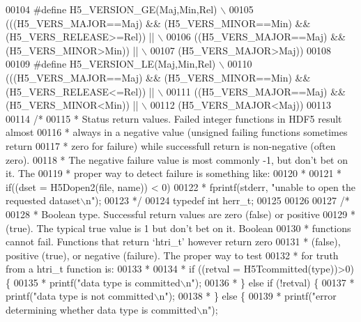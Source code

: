\begin{DoxyCode}
00104 \textcolor{preprocessor}{#define H5\_VERSION\_GE(Maj,Min,Rel) \(\backslash\)}
00105 \textcolor{preprocessor}{       (((H5\_VERS\_MAJOR==Maj) && (H5\_VERS\_MINOR==Min) && (H5\_VERS\_RELEASE>=Rel)) || \(\backslash\)}
00106 \textcolor{preprocessor}{        ((H5\_VERS\_MAJOR==Maj) && (H5\_VERS\_MINOR>Min)) || \(\backslash\)}
00107 \textcolor{preprocessor}{        (H5\_VERS\_MAJOR>Maj))}
00108 
00109 \textcolor{preprocessor}{#define H5\_VERSION\_LE(Maj,Min,Rel) \(\backslash\)}
00110 \textcolor{preprocessor}{       (((H5\_VERS\_MAJOR==Maj) && (H5\_VERS\_MINOR==Min) && (H5\_VERS\_RELEASE<=Rel)) || \(\backslash\)}
00111 \textcolor{preprocessor}{        ((H5\_VERS\_MAJOR==Maj) && (H5\_VERS\_MINOR<Min)) || \(\backslash\)}
00112 \textcolor{preprocessor}{        (H5\_VERS\_MAJOR<Maj))}
00113 
00114 \textcolor{comment}{/*}
00115 \textcolor{comment}{ * Status return values.  Failed integer functions in HDF5 result almost}
00116 \textcolor{comment}{ * always in a negative value (unsigned failing functions sometimes return}
00117 \textcolor{comment}{ * zero for failure) while successfull return is non-negative (often zero).}
00118 \textcolor{comment}{ * The negative failure value is most commonly -1, but don't bet on it.  The}
00119 \textcolor{comment}{ * proper way to detect failure is something like:}
00120 \textcolor{comment}{ *}
00121 \textcolor{comment}{ *  if((dset = H5Dopen2(file, name)) < 0)}
00122 \textcolor{comment}{ *      fprintf(stderr, "unable to open the requested dataset\(\backslash\)n");}
00123 \textcolor{comment}{ */}
00124 \textcolor{keyword}{typedef} \textcolor{keywordtype}{int} herr\_t;
00125 
00126 
00127 \textcolor{comment}{/*}
00128 \textcolor{comment}{ * Boolean type.  Successful return values are zero (false) or positive}
00129 \textcolor{comment}{ * (true). The typical true value is 1 but don't bet on it.  Boolean}
00130 \textcolor{comment}{ * functions cannot fail.  Functions that return `htri\_t' however return zero}
00131 \textcolor{comment}{ * (false), positive (true), or negative (failure). The proper way to test}
00132 \textcolor{comment}{ * for truth from a htri\_t function is:}
00133 \textcolor{comment}{ *}
00134 \textcolor{comment}{ *  if ((retval = H5Tcommitted(type))>0) \{}
00135 \textcolor{comment}{ *      printf("data type is committed\(\backslash\)n");}
00136 \textcolor{comment}{ *  \} else if (!retval) \{}
00137 \textcolor{comment}{ *      printf("data type is not committed\(\backslash\)n");}
00138 \textcolor{comment}{ *  \} else \{}
00139 \textcolor{comment}{ *      printf("error determining whether data type is committed\(\backslash\)n");}

\end{DoxyCode}
